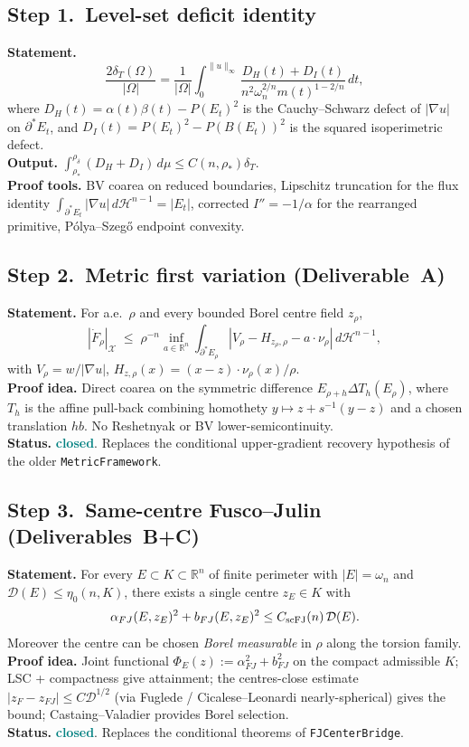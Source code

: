 \documentclass[11pt]{article}
\theoremstyle{definition}
\newcommand{\R}{\mathbb{R}}
\newcommand{\Om}{\Omega}
\newcommand{\X}{\mathcal X}
\newcommand{\rstar}{\rho_{*}}
\newcommand{\rdel}{\rho_\delta}
\newcommand{\Hn}{\mathcal H^{n-1}}
\newcommand{\dD}{\mathcal D}
\newcommand{\CLOSED}{\textcolor{teal}{\bf closed}}
\begin{document}
\subsection*{Step 1.\ Level-set deficit identity}\label{step:1}
\textbf{Statement.}
\[
   \frac{2\delta_{T}(\Om)}{|\Om|}
   =\frac{1}{|\Om|}\int_{0}^{\|u\|_{\infty}}
   \frac{D_{H}(t)+D_{I}(t)}{n^{2}\omega_{n}^{2/n}m(t)^{1-2/n}}\,dt,
\]
where $D_{H}(t)=\alpha(t)\beta(t)-P(E_{t})^{2}$ is the Cauchy--Schwarz
defect of $|\nabla u|$ on $\partial^{*}E_{t}$, and
$D_{I}(t)=P(E_{t})^{2}-P(B(E_{t}))^{2}$ is the squared
isoperimetric defect.\\
\textbf{Output.}  $\int_{\rstar}^{\rdel}(D_{H}+D_{I})\,d\mu\le C(n,\rstar)\delta_{T}$.\\
\textbf{Proof tools.}  BV coarea on reduced boundaries, Lipschitz
truncation for the flux identity
$\int_{\partial^{*}E_{t}}|\nabla u|\,d\Hn=|E_{t}|$, corrected
$I''=-1/\alpha$ for the rearranged primitive, P\'olya--Szeg\H{o}
endpoint convexity.

\subsection*{Step 2.\ Metric first variation (Deliverable~A)}\label{step:2}
\textbf{Statement.}  For a.e.\ $\rho$ and every bounded Borel centre
field $z_{\rho}$,
\[
   |\dot F_{\rho}|_{\X}
   \;\le\; \rho^{-n}\inf_{a\in\R^{n}}
   \int_{\partial^{*}E_{\rho}}|V_{\rho}-H_{z_{\rho},\rho}-a\cdot\nu_{\rho}|\,d\Hn,
\]
with $V_{\rho}=w/|\nabla u|$, $H_{z,\rho}(x)=(x-z)\cdot\nu_{\rho}(x)/\rho$.\\
\textbf{Proof idea.}  Direct coarea on the symmetric difference
$E_{\rho+h}\Delta T_{h}(E_{\rho})$, where $T_{h}$ is the affine
pull-back combining homothety $y\mapsto z+s^{-1}(y-z)$ and a chosen
translation $hb$.  No Reshetnyak or BV lower-semicontinuity.\\
\textbf{Status.}  \CLOSED.  Replaces the conditional upper-gradient
recovery hypothesis of the older \texttt{MetricFramework}.

\subsection*{Step 3.\ Same-centre Fusco--Julin (Deliverables~B+C)}\label{step:3}
\textbf{Statement.}  For every $E\subset K\subset\R^{n}$ of finite
perimeter with $|E|=\omega_{n}$ and $\dD(E)\le\eta_{0}(n,K)$, there
exists a single centre $z_{E}\in K$ with
\[
   \alpha_{FJ}(E,z_{E})^{2}+b_{FJ}(E,z_{E})^{2}\le C_{\rm scFJ}(n)\,\dD(E).
\]
Moreover the centre can be chosen \emph{Borel measurable} in $\rho$
along the torsion family.\\
\textbf{Proof idea.}  Joint functional
$\Phi_{E}(z):=\alpha_{FJ}^{2}+b_{FJ}^{2}$ on the compact admissible
$K$; LSC + compactness give attainment; the centres-close estimate
$|z_{F}-z_{FJ}|\le C\dD^{1/2}$ (via Fuglede / Cicalese--Leonardi
nearly-spherical) gives the bound; Castaing--Valadier provides Borel
selection.\\
\textbf{Status.}  \CLOSED.  Replaces the conditional theorems of
\texttt{FJCenterBridge}.
\end{document}

